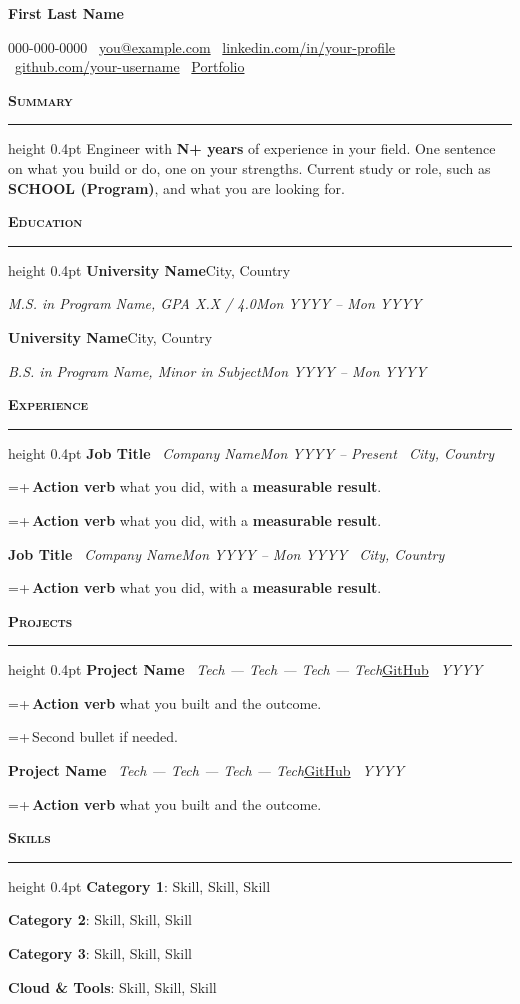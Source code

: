 \documentclass[letterpaper,11pt]{article}
\newcommand{\sep}{\textbar\ }
\newlength{\cvindent}\setlength{\cvindent}{7pt}
\newcommand{\cvsection}[1]{\vspace{9pt}\noindent\textbf{\textsc{#1}}\par\nointerlineskip\vspace{3pt}\hrule height 0.4pt\vspace{7pt}}
\newcommand{\cvrow}[2]{\noindent\hspace{\cvindent}#1\hfill #2\par}
\newcommand{\cvrowin}[2]{\noindent\hspace{\cvindent}#1\hfill #2\hspace{\cvindent}\par}
\newlength{\cvbw}
\newcommand{\cvb}[1]{{\fontsize{9.5}{11.4}\selectfont\settowidth{\cvbw}{\textbullet\,}\hangindent=\dimexpr2\cvindent+\cvbw\relax\hangafter=1\noindent\hspace{2\cvindent}\textbullet\,#1\par}}
\newcommand{\cvgap}{\vspace{4pt}}
\begin{document}
\fontsize{10.5}{12.6}\selectfont

\begin{center}
  {\fontsize{26}{28}\selectfont\textbf{First Last Name}}\par\vspace{2pt}
  {\small 000-000-0000 \sep \href{mailto:you@example.com}{you@example.com} \sep \href{https://linkedin.com/in/your-profile}{linkedin.com/in/your-profile} \sep \href{https://github.com/your-username}{github.com/your-username} \sep \href{https://your-portfolio.example}{Portfolio}}
\end{center}
\vspace{-8pt}

\cvsection{Summary}
Engineer with \textbf{N+ years} of experience in your field. One sentence on what you build or do, one on your strengths. Current study or role, such as \textbf{SCHOOL (Program)}, and what you are looking for.

\cvsection{Education}
\cvrowin{\textbf{University Name}}{City, Country}
\cvrowin{\textit{M.S. in Program Name, GPA X.X / 4.0}}{\textit{Mon YYYY -- Mon YYYY}}
\cvrowin{\textbf{University Name}}{City, Country}
\cvrowin{\textit{B.S. in Program Name, Minor in Subject}}{\textit{Mon YYYY -- Mon YYYY}}

\cvsection{Experience}
\cvrow{\textbf{Job Title} \sep \textit{Company Name}}{\textit{Mon YYYY -- Present \sep City, Country}}
\cvb{\textbf{Action verb} what you did, with a \textbf{measurable result}.}
\cvb{\textbf{Action verb} what you did, with a \textbf{measurable result}.}
\cvgap
\cvrow{\textbf{Job Title} \sep \textit{Company Name}}{\textit{Mon YYYY -- Mon YYYY \sep City, Country}}
\cvb{\textbf{Action verb} what you did, with a \textbf{measurable result}.}
\cvgap

\cvsection{Projects}
\cvrow{\textbf{Project Name} \sep \textit{Tech --- Tech --- Tech --- Tech}}{\href{https://github.com/your-username/project}{GitHub} \sep \textit{YYYY}}
\cvb{\textbf{Action verb} what you built and the outcome.}
\cvb{Second bullet if needed.}
\cvgap
\cvrow{\textbf{Project Name} \sep \textit{Tech --- Tech --- Tech --- Tech}}{\href{https://github.com/your-username/project}{GitHub} \sep \textit{YYYY}}
\cvb{\textbf{Action verb} what you built and the outcome.}

\cvsection{Skills}
\hspace{\cvindent}\textbf{Category 1}: Skill, Skill, Skill\par
\hspace{\cvindent}\textbf{Category 2}: Skill, Skill, Skill\par
\hspace{\cvindent}\textbf{Category 3}: Skill, Skill, Skill\par
\hspace{\cvindent}\textbf{Cloud \& Tools}: Skill, Skill, Skill\par
\end{document}
